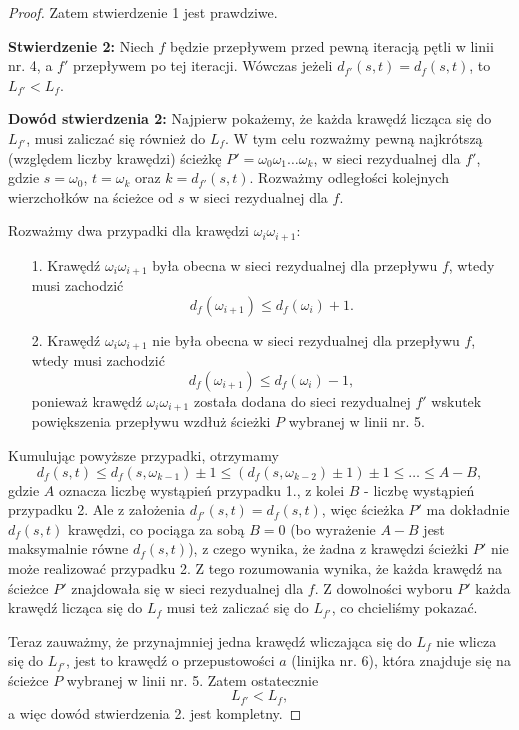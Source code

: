 \begin{theorem}
\begin{proof}
		Zatem stwierdzenie 1 jest prawdziwe.
		
		\textbf{Stwierdzenie 2:} Niech $f$ będzie przepływem przed
		pewną iteracją pętli w linii nr. 4, a $f'$ przepływem 
		po tej iteracji. Wówczas 
		jeżeli $d_{f'}(s, t) = d_f(s,t)$, to $L_{f'} < L_f$.
		
		\textbf{Dowód stwierdzenia 2:} Najpierw pokażemy, że
		każda krawędź licząca się do $L_{f'}$, musi zaliczać się
		również do $L_f$. W tym celu rozważmy pewną najkrótszą (względem
		liczby krawędzi) ścieżkę $P' = \omega_0 \omega_1 \dots \omega_k$,
		w sieci rezydualnej dla $f'$,
		gdzie $s = \omega_0$, $t = \omega_k$ oraz $k = d_{f'}(s, t)$.
		Rozważmy odległości kolejnych wierzchołków na ścieżce 
		od $s$ w sieci rezydualnej dla $f$. 
		
		Rozważmy dwa przypadki dla krawędzi $\omega_i \omega_{i+1}$:
		\begin{itemize}
			\item[1.] Krawędź $\omega_i \omega_{i+1}$ była obecna w sieci rezydualnej
			dla przepływu $f$, wtedy musi zachodzić 
			\[d_f(\omega_{i+1}) \leq d_f(\omega_{i}) + 1.\]
			\item[2.] Krawędź $\omega_i \omega_{i+1}$ nie była obecna w sieci rezydualnej
			dla przepływu $f$, wtedy musi zachodzić
			\[d_f(\omega_{i+1}) \leq d_f(\omega_{i}) - 1,\]
			ponieważ krawędź $\omega_i \omega_{i+1}$ została dodana
			do sieci rezydualnej $f'$ wskutek powiększenia przepływu
			wzdłuż ścieżki $P$ wybranej w linii nr. 5.
		\end{itemize}
		
		Kumulując powyższe przypadki, otrzymamy
		\[d_{f}(s, t) \leq d_{f}(s, \omega_{k-1}) \pm 1 \leq
		(d_{f}(s, \omega_{k-2}) \pm 1) \pm 1 \leq \ldots \leq A - B,\]
		gdzie $A$ oznacza liczbę wystąpień przypadku 1., z kolei
		$B$ - liczbę wystąpień przypadku 2. Ale z założenia 
		$d_{f'}(s,t)=d_f(s,t)$, więc ścieżka $P'$ ma dokładnie $d_f(s,t)$
		krawędzi, co pociąga za sobą $B = 0$ (bo wyrażenie
		$A-B$ jest maksymalnie równe $d_f(s,t)$), z czego wynika, 
		że żadna z krawędzi 
		ścieżki $P'$ nie może realizować przypadku 2. Z tego 
		rozumowania wynika, że każda krawędź na ścieżce $P'$
		znajdowała się w sieci rezydualnej dla $f$. Z dowolności wyboru
		$P'$ każda krawędź licząca się do $L_{f}$ musi też zaliczać się
		do $L_{f'}$, co chcieliśmy pokazać.
		
		Teraz zauważmy, że przynajmniej jedna krawędź wliczająca
		się do $L_f$ nie wlicza się do $L_{f'}$, jest to krawędź 
		o przepustowości $a$ (linijka nr. 6), która znajduje się
		na ścieżce $P$ wybranej w linii nr. 5. Zatem ostatecznie 
		\[L_{f'} < L_f,\]
		a więc dowód stwierdzenia 2. jest kompletny.
		

\end{proof}
\end{theorem}
